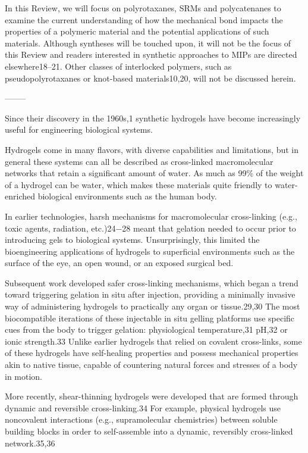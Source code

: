\documentclass[../../main-notes.tex]{subfiles}
\begin{document}
In this Review, we will focus on polyrotaxanes, SRMs and polycatenanes to examine the current understanding of how the mechanical bond impacts the properties of a polymeric material and the potential applications of such materials. 
Although syntheses will be touched upon, it will not be the focus of this Review and readers interested in synthetic approaches to MIPs are directed elsewhere18–21. 
Other classes of interlocked polymers, such as pseudopolyrotaxanes or knot-based materials10,20, will not be discussed herein.

--------

\citep{correaTranslationalApplicationsHydrogels2021}

Since their discovery in the 1960s,1 synthetic hydrogels have become increasingly useful for engineering biological systems.

Hydrogels come in many flavors, with diverse capabilities and limitations, but in general these systems can all be described as cross-linked macromolecular networks that retain a significant amount of water. 
As much as 99\% of the weight of a hydrogel can be water, which makes these materials quite friendly to water-enriched biological environments such as the human body. 

In earlier technologies, harsh mechanisms for macromolecular cross-linking (e.g., toxic agents, radiation,  etc.)24−28 meant that gelation needed to occur prior to introducing gels to biological systems. 
Unsurprisingly, this limited the bioengineering applications of hydrogels to superficial environments such as the surface of the eye, an open wound, or an exposed surgical bed. 

Subsequent work developed safer cross-linking mechanisms, which began a trend toward triggering gelation in situ after injection, providing a minimally invasive way of administering  hydrogels to practically any organ or tissue.29,30 
The most biocompatible iterations of these injectable in situ gelling platforms use specific cues from the body to trigger gelation:  physiological temperature,31 pH,32 or ionic strength.33 
Unlike earlier hydrogels that relied on covalent cross-links, some of these hydrogels have self-healing properties and possess mechanical properties akin to native tissue, capable of countering natural forces and stresses of a body in motion.


More recently, shear-thinning hydrogels were developed that are formed through dynamic and reversible cross-linking.34 
For example, physical hydrogels use noncovalent interactions (e.g., supramolecular chemistries) between soluble building blocks in order to self-assemble into a dynamic, reversibly cross-linked  network.35,36 
\end{document}
